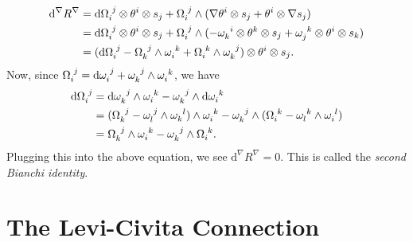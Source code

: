 \documentclass{book}
\renewcommand{\d}{\mathrm{d}}
\theoremstyle{definition}
\numberwithin{equation}{section}
\begin{document}
\begin{equation} \begin{aligned}
    \d^\nabla R^\nabla 
    &= \d\tensor{\Omega}{_i^j} \otimes \theta^i \otimes s_j + \tensor{\Omega}{_i^j} \wedge (\nabla \theta^i \otimes s_j + \theta^i \otimes \nabla s_j) \\
    &= \d\tensor{\Omega}{_i^j} \otimes \theta^i \otimes s_j + \tensor{\Omega}{_i^j} \wedge (-\tensor{\omega}{_k^i} \otimes \theta^k \otimes s_j + \tensor{\omega}{_j^k} \otimes \theta^i \otimes s_k ) \\
    &= ( \d\tensor{\Omega}{_i^j} - \tensor{\Omega}{_k^j} \wedge \tensor{\omega}{_i^k} + \tensor{\Omega}{_i^k} \wedge \tensor{\omega}{_k^j} ) \otimes \theta^i \otimes s_j.
\end{aligned} \end{equation}
Now, since $\tensor{\Omega}{_i^j} = \d\tensor{\omega}{_i^j} + \tensor{\omega}{_k^j} \wedge \tensor{\omega}{_i^k}$, we have 
\begin{equation} \begin{aligned}
    \d\tensor{\Omega}{_i^j} &=  \d\tensor{\omega}{_k^j} \wedge \tensor{\omega}{_i^k} - \tensor{\omega}{_k^j} \wedge \d\tensor{\omega}{_i^k} \\
                            &= (\tensor{\Omega}{_k^j} - \tensor{\omega}{_l^j} \wedge \tensor{\omega}{_k^l}) \wedge \tensor{\omega}{_i^k} 
                                - \tensor{\omega}{_k^j} \wedge (\tensor{\Omega}{_i^k} - \tensor{\omega}{_l^k} \wedge \tensor{\omega}{_i^l}) \\
                            &= \tensor{\Omega}{_k^j} \wedge \tensor{\omega}{_i^k} - \tensor{\omega}{_k^j} \wedge \tensor{\Omega}{_i^k}.
\end{aligned} \end{equation}
Plugging this into the above equation, we see $\d^\nabla R^\nabla = 0$. This is called the \textit{second Bianchi identity}.


\section{The Levi-Civita Connection}
\end{document}
